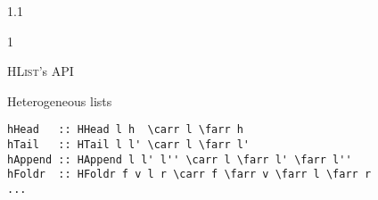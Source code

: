 \documentclass{slides}
\newenvironment{myslide}{\begin{slide}\color{Blue}\begin{boxedminipage}{1.1\hsize}\begin{boxedminipage}{1\hsize}\color{Black}
\vspace{-170\in}
}{%
\smallskip
\end{boxedminipage}
\end{boxedminipage}
\end{slide}}
\newenvironment{myslide}{\begin{slide}
}{%
\end{slide}}
\newenvironment{myslide}{\begin{slide}\color{White}\begin{boxedminipage}{1.1\hsize}\color{Black}
\vspace{-170\in}
}{%
\smallskip
\end{boxedminipage}
\end{slide}}
\newcommand{\header}[1]{{\large \color{Red} #1}}
\newcommand{\blau}[1]{{\vspace{-50\in}\normalsize \color{Blue} #1}}
\newcommand{\HList}{\textsc{HList}}
\newcommand{\farr}{\ensuremath{\to}}
\newcommand{\carr}{\ensuremath{\Rightarrow}}
\begin{document}
\begin{myslide}

\header{\HList's API}

\vspace{-66\in}

\blau{Heterogeneous lists}

\medskip

\begin{Verbatim}[fontfamily=courier,fontsize=\small,commandchars=\\\{\}]
hHead   :: HHead l h  \carr l \farr h
hTail   :: HTail l l' \carr l \farr l'
hAppend :: HAppend l l' l'' \carr l \farr l' \farr l''
hFoldr  :: HFoldr f v l r \carr f \farr v \farr l \farr r
...
\end{Verbatim}

\end{myslide}



\end{document}
